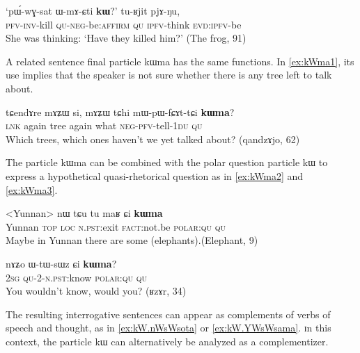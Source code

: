 \documentclass[oldfontcommands,oneside,a4paper,11pt]{article}
\newcommand{\ipa}[1]{{\phon #1}} %
\begin{document}
  \begin{exe} 
 \ex \label{ex:pWwGsat}
\gll 
`\ipa{pɯ́-wɣ-sat} 	\ipa{ɯ-mɤ-ɕti} 	\ipa{\textbf{kɯ}?}' 	\ipa{tu-ʁjit} 	\ipa{pjɤ-ŋu,} \\
\textsc{pfv-inv}-kill \textsc{qu-neg}-be:\textsc{affirm} \textsc{qu} \textsc{ipfv}-think \textsc{evd:ipfv}-be \\
\glt She was thinking: `Have they killed him?' (The frog, 91)
 \end{exe}  
 
 A related sentence final particle \ipa{kɯma} has the same functions. In  \ref{ex:kWma1}, its use implies that   the speaker is not sure whether there is any tree left to talk about.
   \begin{exe} 
 \ex \label{ex:kWma1}
\gll 
 \ipa{tɕendɤre} 	\ipa{mɤʑɯ} 	\ipa{si,} 	\ipa{mɤʑɯ} 	\ipa{tɕhi} 	\ipa{mɯ-pɯ-fɕɤt-tɕi} 	\ipa{\textbf{kɯma}?} \\
\textsc{lnk} again tree again what \textsc{neg-pfv}-tell-\textsc{1du} \textsc{qu} \\
\glt Which trees, which ones haven't we yet talked about?  (qandzɤjo, 62)
  \end{exe} 
  
  The particle \ipa{kɯma} can be combined with the polar question particle \ipa{kɯ} to express a hypothetical quasi-rhetorical question as in \ref{ex:kWma2} and \ref{ex:kWma3}.
     \begin{exe} 
 \ex \label{ex:kWma2}
\gll 
 <Yunnan> \ipa{nɯ} 	\ipa{tɕu} 	\ipa{tu} 	\ipa{maʁ} 	\ipa{ɕi} 	\ipa{\textbf{kɯma}} \\
 Yunnan \textsc{top} \textsc{loc} \textsc{n.pst:}exit \textsc{fact}:not.be \textsc{polar:qu} \textsc{qu} \\
\glt  Maybe in Yunnan there are some (elephants).(Elephant, 9)
   \end{exe}
   
        \begin{exe} 
 \ex \label{ex:kWma3}
\gll 
 \ipa{nɤʑo} 	\ipa{ɯ-tɯ-sɯz} 	\ipa{ɕi} 	\ipa{\textbf{kɯma}?}  \\
 \textsc{2sg} \textsc{qu-2-n.pst}:know \textsc{polar:qu} \textsc{qu} \\
\glt You wouldn't know, would you? (ʁzɤr, 34)
    \end{exe}
    
    
    The resulting interrogative sentences can appear as complements of verbs of speech and thought, as in \ref{ex:kW.nWsWsota} or \ref{ex:kW.YWsWsama}. ɪn this context, the particle \ipa{kɯ} can alternatively be analyzed as a complementizer.
    
\end{document}
